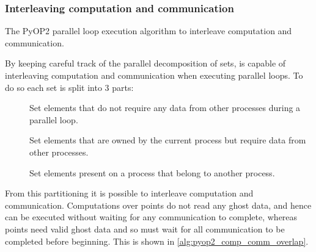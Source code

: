 \documentclass[thesis]{subfiles}
\begin{document}
\subsubsection{Interleaving computation and communication}

\begin{algorithm}
  \caption{The PyOP2 parallel loop execution algorithm to interleave computation and communication.}
  \begin{algorithmic}[1]
    \State {} 

     
      \State {}
    \EndFor

    \State {} 

     
      \State {}
    \EndFor
  \end{algorithmic}
  \label{alg:pyop2_comp_comm_overlap}
\end{algorithm}

By keeping careful track of the parallel decomposition of sets,  is capable of interleaving computation and communication when executing parallel loops.
To do so each set is split into 3 parts:
\begin{description}
  \item[\coreiter]
    Set elements that do not require any data from other processes during a parallel loop.

  \item[\ownediter]
    Set elements that are owned by the current process but require data from other processes.

  \item[\ghostiter]
    Set elements present on a process that belong to another process.
\end{description}

From this partitioning it is possible to interleave computation and communication.
Computations over \coreiter points do not read any ghost data, and hence can be executed without waiting for any communication to complete, whereas \ownediter points need valid ghost data and so must wait for all communication to be completed before beginning.
This is shown in \cref{alg:pyop2_comp_comm_overlap}.
\end{document}
